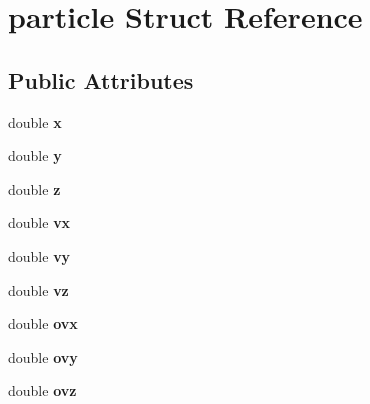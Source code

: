 \hypertarget{structparticle}{
\section{particle Struct Reference}
\label{structparticle}
}
\subsection*{Public Attributes}
\begin{DoxyCompactItemize}
\item 
\hypertarget{structparticle_adf124f2f4b2d0a90306893c2889fb1a6}{
double {\bfseries x}}
\label{structparticle_adf124f2f4b2d0a90306893c2889fb1a6}

\item 
\hypertarget{structparticle_aafbd59d3b7e2d80b6c77a63be017a758}{
double {\bfseries y}}
\label{structparticle_aafbd59d3b7e2d80b6c77a63be017a758}

\item 
\hypertarget{structparticle_ae1ba305626c47a5fcea844fb5a8ef870}{
double {\bfseries z}}
\label{structparticle_ae1ba305626c47a5fcea844fb5a8ef870}

\item 
\hypertarget{structparticle_a27d2da5b5c1011d6f21e2006e06c5340}{
double {\bfseries vx}}
\label{structparticle_a27d2da5b5c1011d6f21e2006e06c5340}

\item 
\hypertarget{structparticle_aea55748896289cea56face329d412cd7}{
double {\bfseries vy}}
\label{structparticle_aea55748896289cea56face329d412cd7}

\item 
\hypertarget{structparticle_af3539c02d572ee881f3a6bfad191f96d}{
double {\bfseries vz}}
\label{structparticle_af3539c02d572ee881f3a6bfad191f96d}

\item 
\hypertarget{structparticle_a768f9ddbed7f23834819350f71b90b6d}{
double {\bfseries ovx}}
\label{structparticle_a768f9ddbed7f23834819350f71b90b6d}

\item 
\hypertarget{structparticle_adc96ba4b41245e26b5b34c536dae6842}{
double {\bfseries ovy}}
\label{structparticle_adc96ba4b41245e26b5b34c536dae6842}

\item 
\hypertarget{structparticle_a135e7d6f75cfb33c71f3f9e2213c978c}{
double {\bfseries ovz}}
\label{structparticle_a135e7d6f75cfb33c71f3f9e2213c978c}


\end{DoxyCompactItemize}
